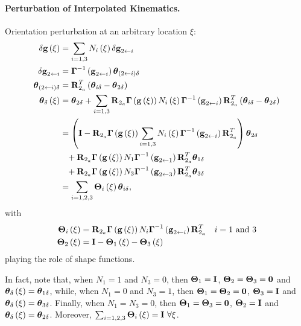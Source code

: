 \paragraph{Perturbation of Interpolated Kinematics.}
Orientation perturbation at an arbitrary location $\xi$:
\begin{align}
	\delta\bm{\mathbf{g}}\left( \xi \right)
	&=
	\sum_{i=1,3} N_i\left( \xi \right) \delta\bm{\mathbf{g}}_{2\leftarrow i}
	\\
	\delta\bm{\mathbf{g}}_{2\leftarrow i}
	&=
	\bm{\mathbf{\Gamma}}^{-1}\left( \bm{\mathbf{g}}_{2\leftarrow i} \right) \bm{\mathbf{\theta}}_{(2\leftarrow i) \delta}
	\\
	\bm{\mathbf{\theta}}_{(2\leftarrow i) \delta}
	&=
	\bm{\mathbf{R}}_{2_a}^T \left( 
		\bm{\mathbf{\theta}}_{i\delta}
		- \bm{\mathbf{\theta}}_{2\delta}
	 \right)
	\\
	\bm{\mathbf{\theta}}_{\delta}\left( \xi \right)
	&=
	\bm{\mathbf{\theta}}_{2\delta}
	+ \sum_{i=1,3} \bm{\mathbf{R}}_{2_a} \bm{\mathbf{\Gamma}}\left( \bm{\mathbf{g}}\left( \xi \right) \right)
		N_i\left( \xi \right) \bm{\mathbf{\Gamma}}^{-1}\left( \bm{\mathbf{g}}_{2\leftarrow i} \right)
		\bm{\mathbf{R}}_{2_a}^T \left( \bm{\mathbf{\theta}}_{i\delta} - \bm{\mathbf{\theta}}_{2\delta} \right)
	\nonumber \\
	&= \left( 
		\bm{\mathbf{I}}
		- \bm{\mathbf{R}}_{2_a} \bm{\mathbf{\Gamma}}\left( \bm{\mathbf{g}}\left( \xi \right) \right)
			\sum_{i=1,3} N_i\left( \xi \right) \bm{\mathbf{\Gamma}}^{-1}\left( \bm{\mathbf{g}}_{2\leftarrow i} \right)
			\bm{\mathbf{R}}_{2_a}^T
	 \right) \bm{\mathbf{\theta}}_{2\delta}
	\nonumber \\
	& \hphantom{= } \mbox{}
	+ \bm{\mathbf{R}}_{2_a} \bm{\mathbf{\Gamma}}\left( \bm{\mathbf{g}}\left( \xi \right) \right)
		N_1\bm{\mathbf{\Gamma}}^{-1}\left( \bm{\mathbf{g}}_{2\leftarrow 1} \right)
		\bm{\mathbf{R}}_{2_a}^T \bm{\mathbf{\theta}}_{1\delta}
	\nonumber \\
	& \hphantom{= } \mbox{}
	+ \bm{\mathbf{R}}_{2_a} \bm{\mathbf{\Gamma}}\left( \bm{\mathbf{g}}\left( \xi \right) \right)
		N_3\bm{\mathbf{\Gamma}}^{-1}\left( \bm{\mathbf{g}}_{2\leftarrow 3} \right)
		\bm{\mathbf{R}}_{2_a}^T \bm{\mathbf{\theta}}_{3\delta}
	\nonumber \\
	&=
	\sum_{i=1,2,3} \bm{\mathbf{\Theta}}_i\left( \xi \right) \bm{\mathbf{\theta}}_{i\delta}
	,
\end{align}
with
\begin{subequations}
\begin{align}
	\bm{\mathbf{\Theta}}_i\left( \xi \right)
	&=
	\bm{\mathbf{R}}_{2_a} \bm{\mathbf{\Gamma}}\left( \bm{\mathbf{g}}\left( \xi \right) \right)
		N_i\bm{\mathbf{\Gamma}}^{-1}\left( \bm{\mathbf{g}}_{2\leftarrow i} \right)
		\bm{\mathbf{R}}_{2_a}^T
		& i=\text{1 and 3}
	\\
	\bm{\mathbf{\Theta}}_2\left( \xi \right)
	&=
	\bm{\mathbf{I}} - \bm{\mathbf{\Theta}}_1\left( \xi \right) - \bm{\mathbf{\Theta}}_3\left( \xi \right)
\end{align}
\end{subequations}
playing the role of shape functions.

In fact, note that, when $N_1=1$ and $N_3=0$, then
$\bm{\mathbf{\Theta}}_1=\bm{\mathbf{I}}$, $\bm{\mathbf{\Theta}}_2=\bm{\mathbf{\Theta}}_3=\bm{\mathbf{0}}$
and $\bm{\mathbf{\theta}}_{\delta}\left( \xi \right)=\bm{\mathbf{\theta}}_{1\delta}$,
while, when $N_1=0$ and $N_3=1$, then
$\bm{\mathbf{\Theta}}_1=\bm{\mathbf{\Theta}}_2=\bm{\mathbf{0}}$, $\bm{\mathbf{\Theta}}_3=\bm{\mathbf{I}}$
and $\bm{\mathbf{\theta}}_{\delta}\left( \xi \right)=\bm{\mathbf{\theta}}_{3\delta}$.
Finally, when $N_1=N_3=0$, then
$\bm{\mathbf{\Theta}}_1=\bm{\mathbf{\Theta}}_3=\bm{\mathbf{0}}$, $\bm{\mathbf{\Theta}}_2=\bm{\mathbf{I}}$
and $\bm{\mathbf{\theta}}_{\delta}\left( \xi \right)=\bm{\mathbf{\theta}}_{2\delta}$.
Moreover, $\sum_{i=1,2,3}\TT{\Theta}_i\plbr{\xi}=\TT{I} \ \forall\xi$.

